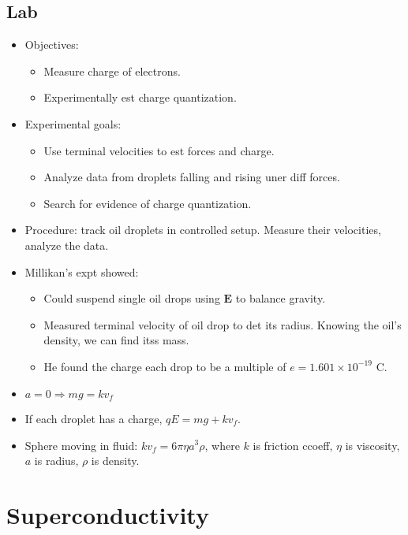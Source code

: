 \documentclass[twocolumn]{article}
\begin{document}
\subsection{Lab}
\begin{itemize}
    \item Objectives:
    \begin{itemize}
        \item Measure charge of electrons.
        \item Experimentally est charge quantization.
    \end{itemize}
    \item Experimental goals:
    \begin{itemize}
        \item Use terminal velocities to est forces and charge.
        \item Analyze data from droplets falling and rising uner diff forces.
        \item Search for evidence of charge quantization.
    \end{itemize}
    \item Procedure: track oil droplets in controlled setup. Measure their velocities, analyze the data.
    \item Millikan's expt showed:
    \begin{itemize}
        \item Could suspend single oil drops using $\mathbf{E}$ to balance gravity.
        \item Measured terminal velocity of oil drop to det its radius. Knowing the oil's density, we can find itss mass.
        \item He found the charge each drop to be a multiple of $e =1.601 \times 10^{-19}$ C.
    \end{itemize}
    \item $a = 0 \Longrightarrow mg = kv_f$
    \item If each droplet has a charge, $qE = mg + kv_f$.
    \item Sphere moving in fluid: $kv_f = 6 \pi \eta a^3 \rho$, where $k$ is friction ccoeff, $\eta$ is viscosity, $a$ is radius, $\rho$ is density.
\end{itemize}

\section{Superconductivity}
\end{document}

